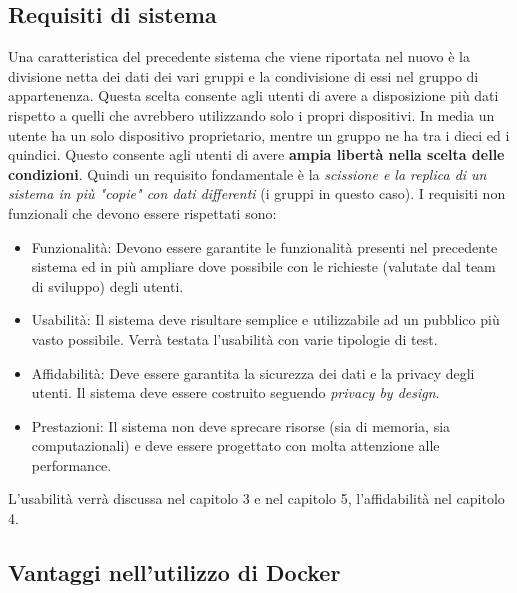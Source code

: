 \documentclass[a4paper,10pt]{memoir}
\begin{document}
\subsection{Requisiti di sistema}
Una caratteristica del precedente sistema che viene riportata nel nuovo è la divisione netta dei dati dei vari gruppi e la condivisione di essi nel gruppo di appartenenza.
Questa scelta consente agli utenti di avere a disposizione più dati rispetto a quelli che avrebbero utilizzando solo i propri dispositivi. In media un utente ha un solo dispositivo proprietario, mentre un gruppo ne ha tra i dieci ed i quindici.
Questo consente agli utenti di avere \textbf{ampia libertà nella scelta delle condizioni}.
Quindi un requisito fondamentale è la \textit{scissione e la replica di un sistema in più "copie" con dati differenti} (i gruppi in questo caso).
I requisiti non funzionali che devono essere rispettati sono:

\begin{itemize}
    \item Funzionalità: Devono essere garantite le funzionalità presenti nel precedente sistema ed in più ampliare dove possibile con le richieste (valutate dal team di sviluppo) degli utenti.
    \item Usabilità: Il sistema deve risultare semplice e utilizzabile ad un pubblico più vasto possibile. Verrà testata l'usabilità con varie tipologie di test.
    \item Affidabilità: Deve essere garantita la sicurezza dei dati e la privacy degli utenti. Il sistema deve essere costruito seguendo \textit{privacy by design}.
    \item Prestazioni: Il sistema non deve sprecare risorse (sia di memoria, sia computazionali) e deve essere progettato con molta attenzione alle performance. 
\end{itemize}
L'usabilità verrà discussa nel capitolo 3 e nel capitolo 5,
l'affidabilità nel capitolo 4.

\clearpage


\subsection{Vantaggi nell'utilizzo di Docker}
\end{document}
